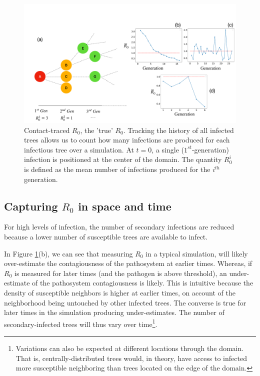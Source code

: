 \\

\begin{figure}
    \centering
    \includegraphics[scale=0.255]{chapter5/figures/fig1.pdf}
    \caption{Contact-traced $R_0$, the 'true' $R_0$. Tracking the history of all infected trees allows us to count how many infections are produced for each infectious tree over a simulation. At $t=0$, a single ($1^{st}$-generation) infection is positioned at the center of the domain. The quantity $R^i_0$ is defined as the mean number of infections produced for  the $i^{th}$ generation.}
    \label{fig:contact-trace}
\end{figure}

\subsection{Capturing $R_0$ in space and time}

For high levels of infection, the number of secondary infections are reduced because a lower number of susceptible trees are available to infect. 

In Figure \ref{fig:contact-trace}(b), we can see that measuring $R_0$ in a typical simulation, %
will likely over-estimate the contagiousness of the pathosystem at earlier times. %
Whereas, if $R_0$ is measured for later times (and the pathogen is above threshold), an %
under-estimate of the pathosystem contagiousness is likely. %
This is intuitive because the density of susceptible neighbors is higher at earlier times, %
on account of the neighborhood being untouched by other infected trees. %
The converse is true for later times in the simulation producing under-estimates. %
The number of secondary-infected trees will thus vary over time\footnote{Variations can %
also be expected at different locations through the domain. That is, centrally-distributed %
trees would, in theory, have access to infected more susceptible neighboring than trees %
located on the edge of the domain.}. %

